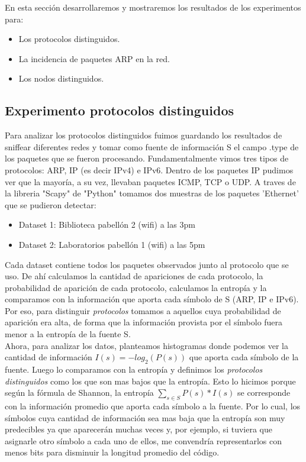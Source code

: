 En esta sección desarrollaremos y mostraremos los resultados de los experimentos para:

\begin{itemize}
\item Los protocolos distinguidos.
\item La incidencia de paquetes ARP en la red.
\item Los nodos distinguidos.
\end{itemize}

\subsection{Experimento protocolos distinguidos}

Para analizar los protocolos distinguidos fuimos guardando los resultados de sniffear diferentes redes y tomar como fuente de información S el campo .type de los paquetes que se fueron procesando. Fundamentalmente vimos tres tipos de protocolos: ARP, IP (es decir IPv4) e IPv6. Dentro de los paquetes IP pudimos ver que la mayoría, a su vez, llevaban paquetes ICMP, TCP o UDP. A traves de la libreria "Scapy" de "Python" tomamos dos muestras de los paquetes 'Ethernet' que se pudieron detectar:

\begin{itemize}
\item Dataset 1: Biblioteca pabellón 2 (wifi) a las 3pm
\item Dataset 2: Laboratorios pabellón 1 (wifi) a las 5pm
\end{itemize}

Cada dataset contiene todos los paquetes observados junto al protocolo que se uso. De ahí calculamos la cantidad de apariciones de cada protocolo, la probabilidad de aparición de cada protocolo, calculamos la entropía y la comparamos con la información que aporta cada símbolo de S (ARP, IP e IPv6).\\

Por eso, para distinguir \emph{protocolos} tomamos a
aquellos cuya probabilidad de aparición era alta, de forma que la información provista por el símbolo fuera menor a la entropía de la fuente S.\\

Ahora, para analizar los datos, planteamos histogramas donde podemos ver la cantidad de información $I(s) = -log_2(P(s))$ que aporta cada símbolo de la fuente. Luego lo comparamos con la entropía y definimos los \emph{protocolos distinguidos} como los que son mas bajos que la entropía. Esto lo hicimos porque según la fórmula de Shannon, la entropía $\sum\limits_{s \in S} P(s) * I(s)$ se corresponde con la información promedio que aporta cada símbolo a la fuente. Por lo cual, los símbolos cuya cantidad de información sea mas baja que la entropía son muy predecibles ya que aparecerán muchas veces y, por ejemplo, si tuviera que asignarle otro símbolo a cada uno de ellos, me convendría representarlos con menos bits para disminuir la longitud promedio del código. \\

